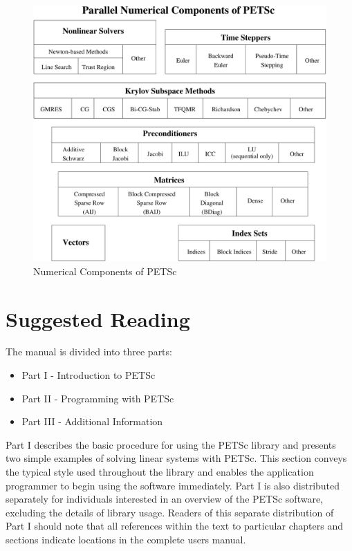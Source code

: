 \begin{figure}[hbt]
\centerline{ \includegraphics{zoom}}
\caption{Numerical Components of PETSc}
\label{fig_2}
\end{figure}

\section{Suggested Reading}

The manual is
divided into three parts:
\begin{itemize}
\item Part I - Introduction to PETSc
\item Part II - Programming with PETSc
\item Part III - Additional Information
\end{itemize}

Part I describes
the basic procedure for using the PETSc library and presents two
simple examples of solving linear systems with PETSc.  This section
conveys the typical style used throughout the library and enables the
application programmer to begin using the software immediately.
Part I is also distributed separately for individuals interested in an 
overview of the PETSc software, excluding the details of library usage.
Readers of this separate distribution of Part I should note that all
references within the text to particular chapters and sections 
indicate locations in the complete users manual.

